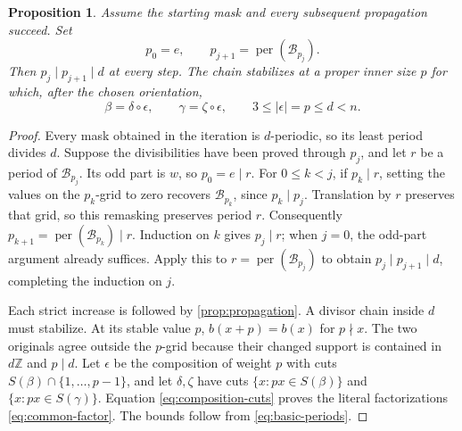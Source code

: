 \documentclass[11pt,a4paper]{amsart}
\numberwithin{equation}{section}
\theoremstyle{plain}
\newtheorem{proposition}[theorem]{Proposition}
\theoremstyle{definition}
\newcommand{\Z}{\mathbb Z}
\newcommand{\per}{\operatorname{per}}
\begin{document}
\begin{proposition}\label{prop:termination}
Assume the starting mask and every subsequent propagation succeed.
Set
\[
p_0=e,\qquad p_{j+1}=\per(\mathcal B_{p_j}).
\]
Then \(p_j\mid p_{j+1}\mid d\) at every step.  The chain stabilizes at a
proper inner size \(p\) for which, after the chosen orientation,
\begin{equation}\label{eq:common-factor}
\beta=\delta\circ\epsilon,\qquad
\gamma=\zeta\circ\epsilon,\qquad 3\le|\epsilon|=p\le d<n.
\end{equation}
\end{proposition}
\begin{proof}
Every mask obtained in the iteration is \(d\)-periodic, so its least period
divides \(d\).  Suppose the divisibilities have been proved through \(p_j\),
and let \(r\) be a period of \(\mathcal B_{p_j}\).  Its odd part is \(w\),
so \(p_0=e\mid r\).  For \(0\le k<j\), if \(p_k\mid r\), setting the
values on the \(p_k\)-grid to zero recovers \(\mathcal B_{p_k}\), since
\(p_k\mid p_j\).  Translation by \(r\) preserves that grid, so this
remasking preserves period \(r\).  Consequently
\(p_{k+1}=\per(\mathcal B_{p_k})\mid r\).  Induction on \(k\) gives
\(p_j\mid r\); when \(j=0\), the odd-part argument already suffices.
Apply this to \(r=\per(\mathcal B_{p_j})\) to obtain
\(p_j\mid p_{j+1}\mid d\), completing the induction on \(j\).

Each strict increase is followed by \cref{prop:propagation}.  A divisor
chain inside \(d\) must stabilize.  At its stable value \(p\),
\(b(x+p)=b(x)\) for \(p\nmid x\).  The two originals agree outside the
\(p\)-grid because their changed support is contained in \(d\Z\) and
\(p\mid d\).  Let \(\epsilon\) be the composition of weight \(p\) with cuts
\(S(\beta)\cap\{1,\ldots,p-1\}\), and let \(\delta,\zeta\) have cuts
\(\{x:px\in S(\beta)\}\) and \(\{x:px\in S(\gamma)\}\).
Equation \eqref{eq:composition-cuts} proves the literal factorizations
\eqref{eq:common-factor}.  The bounds follow from \eqref{eq:basic-periods}.
\end{proof}
\end{document}
